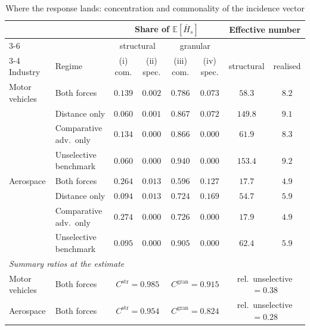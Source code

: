 \begin{table}[H]
    \centering
    \caption{Where the response lands: concentration and commonality of the incidence vector\label{tab:incidence}}
    \begin{tabular}{llcccccc}
    \hline\hline
    & & \multicolumn{4}{c}{Share of $\mathbb{E}[\bar H_{s}]$} & \multicolumn{2}{c}{Effective number} \\
    \cline{3-6}\cline{7-8}
    & & \multicolumn{2}{c}{structural} & \multicolumn{2}{c}{granular} & & \\
    \cline{3-4}\cline{5-6}
    Industry & Regime & (i) com. & (ii) spec. & (iii) com. & (iv) spec. & structural & realised \\
    \hline
    Motor vehicles & Both forces                & $0.139$ & $0.002$ & $0.786$ & $0.073$ & $58.3$  & $8.2$ \\
                   & Distance only              & $0.060$ & $0.001$ & $0.867$ & $0.072$ & $149.8$ & $9.1$ \\
                   & Comparative adv.\ only     & $0.134$ & $0.000$ & $0.866$ & $0.000$ & $61.9$  & $8.3$ \\
                   & Unselective benchmark      & $0.060$ & $0.000$ & $0.940$ & $0.000$ & $153.4$ & $9.2$ \\[0.3em]
    Aerospace      & Both forces                & $0.264$ & $0.013$ & $0.596$ & $0.127$ & $17.7$  & $4.9$ \\
                   & Distance only              & $0.094$ & $0.013$ & $0.724$ & $0.169$ & $54.7$  & $5.9$ \\
                   & Comparative adv.\ only     & $0.274$ & $0.000$ & $0.726$ & $0.000$ & $17.9$  & $4.9$ \\
                   & Unselective benchmark      & $0.095$ & $0.000$ & $0.905$ & $0.000$ & $62.4$  & $5.9$ \\
    \hline
    \multicolumn{8}{l}{\emph{Summary ratios at the estimate}}\\
    Motor vehicles & Both forces & \multicolumn{2}{c}{$C^{\text{str}}=0.985$} & \multicolumn{2}{c}{$C^{\text{gran}}=0.915$} & \multicolumn{2}{c}{rel.\ unselective $=0.38$}\\
    Aerospace      & Both forces & \multicolumn{2}{c}{$C^{\text{str}}=0.954$} & \multicolumn{2}{c}{$C^{\text{gran}}=0.824$} & \multicolumn{2}{c}{rel.\ unselective $=0.28$}\\
    \hline\hline
    \end{tabular}

\end{table}
